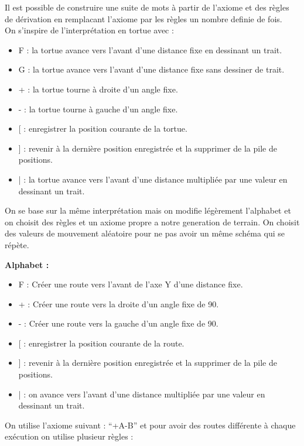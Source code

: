 Il est possible de construire une suite de mots à partir de l’axiome et des règles de dérivation en remplacant l'axiome par les règles un nombre 
definie de fois. \\

On s’inspire de l’interprétation en tortue \cite{flake2000computational} avec :

\begin{itemize}
  \item F : la tortue avance vers l’avant d’une distance fixe en dessinant un trait.
  \item G : la tortue avance vers l’avant d’une distance fixe sans dessiner de trait.
  \item + : la tortue tourne à droite d'un angle fixe.
  \item - : la tortue tourne à gauche d'un angle fixe.
  \item {[} : enregistrer la position courante de la tortue.
  \item {]} : revenir à la dernière position enregistrée et la supprimer de la pile de positions.
  \item | : la tortue avance vers l’avant d’une distance multipliée par une valeur en dessinant un trait.
\end{itemize}

On se base sur la même interprétation mais on modifie légèrement l’alphabet et on choisit des règles et un axiome propre a notre generation de terrain.
On choisit des valeurs de mouvement aléatoire pour ne pas avoir un même schéma qui se répète.

\textbf{Alphabet :}

\begin{itemize}
  \item F : Créer une route vers l’avant de l’axe Y d’une distance fixe.
  \item + : Créer une route vers la droite d’un angle fixe de 90.
  \item - : Créer une route vers la gauche d’un angle fixe de 90.
  \item {[} : enregistrer la position courante de la route.
  \item {]} : revenir à la dernière position enregistrée et la supprimer de la pile de positions.
  \item | : on avance vers l’avant d’une distance multipliée par une valeur en dessinant un trait.
\end{itemize}

On utilise l’axiome suivant : “+A-B” et pour avoir des routes différente à chaque exécution on utilise plusieur règles :

